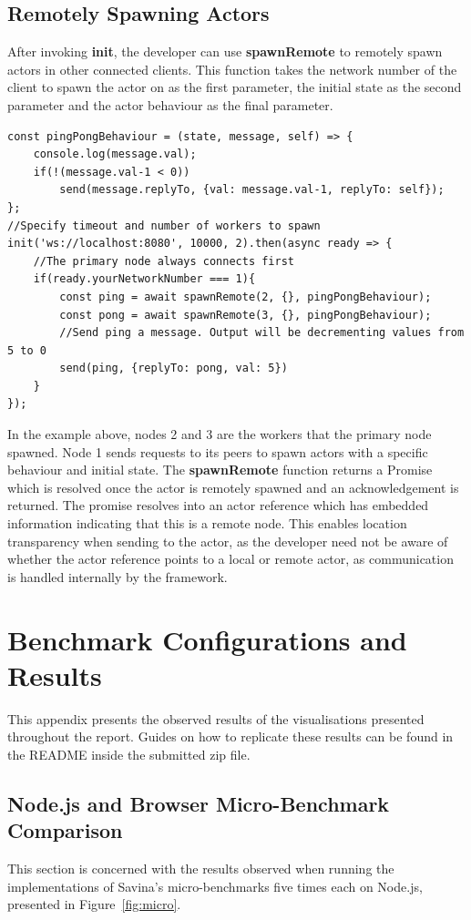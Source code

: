 \documentclass[oneside]{um-fict}
\begin{document}
\section{Remotely Spawning Actors}
After invoking \textbf{init}, the developer can use \textbf{spawnRemote} to remotely spawn actors in other connected clients. This function takes the network number of the client to spawn the actor on as the first parameter, the initial state as the second parameter and the actor behaviour as the final parameter.
\newpage
\begin{lstlisting}
const pingPongBehaviour = (state, message, self) => {
    console.log(message.val);
    if(!(message.val-1 < 0))
        send(message.replyTo, {val: message.val-1, replyTo: self});
};
//Specify timeout and number of workers to spawn
init('ws://localhost:8080', 10000, 2).then(async ready => {
    //The primary node always connects first
    if(ready.yourNetworkNumber === 1){
        const ping = await spawnRemote(2, {}, pingPongBehaviour);
        const pong = await spawnRemote(3, {}, pingPongBehaviour);
        //Send ping a message. Output will be decrementing values from 5 to 0
        send(ping, {replyTo: pong, val: 5})
    }
});
\end{lstlisting}
In the example above, nodes 2 and 3 are the workers that the primary node spawned. Node 1 sends requests to its peers to spawn actors with a specific behaviour and initial state. The \textbf{spawnRemote} function returns a Promise which is resolved once the actor is remotely spawned and an acknowledgement is returned. The promise resolves into an actor reference which has embedded information indicating that this is a remote node. This enables location transparency when sending to the actor, as the developer need not be aware of whether the actor reference points to a local or remote actor, as communication is handled internally by the framework.

\chapter{Benchmark Configurations and Results}\label{appendix:results}
This appendix presents the observed results of the visualisations presented throughout the report. Guides on how to replicate these results can be found in the README inside the submitted zip file.

\section{Node.js and Browser Micro-Benchmark Comparison}\label{section:microcomparison}
This section is concerned with the results observed when running the implementations of Savina's micro-benchmarks five times each on Node.js, presented in Figure~\ref{fig:micro}.
\end{document}
